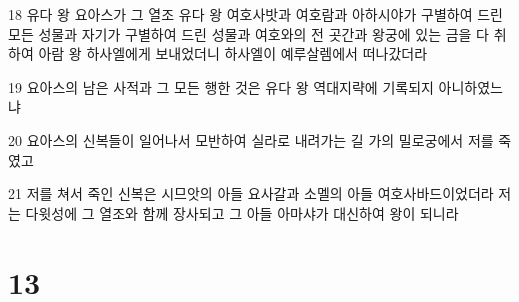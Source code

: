 \par 18 유다 왕 요아스가 그 열조 유다 왕 여호사밧과 여호람과 아하시야가 구별하여 드린 모든 성물과 자기가 구별하여 드린 성물과 여호와의 전 곳간과 왕궁에 있는 금을 다 취하여 아람 왕 하사엘에게 보내었더니 하사엘이 예루살렘에서 떠나갔더라
\par 19 요아스의 남은 사적과 그 모든 행한 것은 유다 왕 역대지략에 기록되지 아니하였느냐
\par 20 요아스의 신복들이 일어나서 모반하여 실라로 내려가는 길 가의 밀로궁에서 저를 죽였고
\par 21 저를 쳐서 죽인 신복은 시므앗의 아들 요사갈과 소멜의 아들 여호사바드이었더라 저는 다윗성에 그 열조와 함께 장사되고 그 아들 아마샤가 대신하여 왕이 되니라

\chapter{13}

